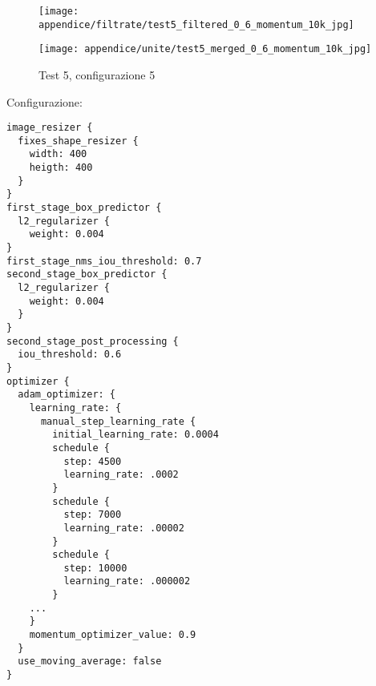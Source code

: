 \newpage
\begin{figure}[H]  
    \begin{minipage}{.5\columnwidth}  
        \centering  
        \texttt{[image: appendice/filtrate/test5\_filtered\_0\_6\_momentum\_10k\_jpg]}  
    \end{minipage}%
    \begin{minipage}{0.5\columnwidth}  
        \centering  
        \texttt{[image: appendice/unite/test5\_merged\_0\_6\_momentum\_10k\_jpg]}  
    \end{minipage}  
    \caption{Test 5, configurazione 5}
\end{figure}%
Configurazione:
\begin{multicols}{2}
    \begin{lstlisting}
image_resizer {
  fixes_shape_resizer {
    width: 400
    heigth: 400
  }
}
first_stage_box_predictor {
  l2_regularizer {
    weight: 0.004
}
first_stage_nms_iou_threshold: 0.7
second_stage_box_predictor {
  l2_regularizer {
    weight: 0.004
  }
}
second_stage_post_processing {
  iou_threshold: 0.6
}
optimizer {
  adam_optimizer: {
    learning_rate: {
      manual_step_learning_rate {
        initial_learning_rate: 0.0004
        schedule {
          step: 4500
          learning_rate: .0002
        }
        schedule {
          step: 7000
          learning_rate: .00002
        }
        schedule {
          step: 10000
          learning_rate: .000002
        }
    ...
    }
    momentum_optimizer_value: 0.9
  }
  use_moving_average: false
}
    \end{lstlisting}
\end{multicols}


